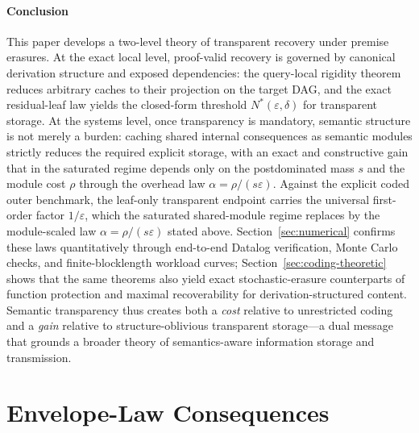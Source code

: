 \documentclass[journal]{IEEEtran}
\numberwithin{equation}{section}
\begin{document}
\paragraph*{Conclusion}
This paper develops a two-level theory of transparent recovery under premise
erasures.  At the exact local level, proof-valid recovery is governed by
canonical derivation structure and exposed dependencies: the query-local
rigidity theorem reduces arbitrary caches to their projection on the target
DAG, and the exact residual-leaf law yields the closed-form threshold
\(N^*(\varepsilon,\delta)\) for transparent storage.  At the systems level,
once transparency is mandatory, semantic structure is not merely a burden:
caching shared internal consequences as semantic modules strictly reduces the
required explicit storage, with an exact and constructive gain that in the
saturated regime depends only on the postdominated mass \(s\) and the module
cost \(\rho\) through the overhead law \(\alpha=\rho/(s\varepsilon)\).
Against the explicit coded outer benchmark, the leaf-only transparent
endpoint carries the universal first-order factor \(1/\varepsilon\),
which the saturated shared-module regime replaces by the module-scaled
law \(\alpha=\rho/(s\varepsilon)\) stated above.  Section~\ref{sec:numerical} confirms these laws
quantitatively through end-to-end Datalog verification, Monte Carlo checks,
and finite-blocklength workload curves; Section~\ref{sec:coding-theoretic}
shows that the same theorems also yield exact stochastic-erasure
counterparts of function protection and maximal recoverability for
derivation-structured content.  Semantic transparency thus creates both a
\emph{cost} relative to unrestricted coding and a \emph{gain} relative to
structure-oblivious transparent storage---a dual message that grounds a
broader theory of semantics-aware information storage and transmission.

\appendices

\section{Envelope-Law Consequences}
\label{app:envelope}
\end{document}
